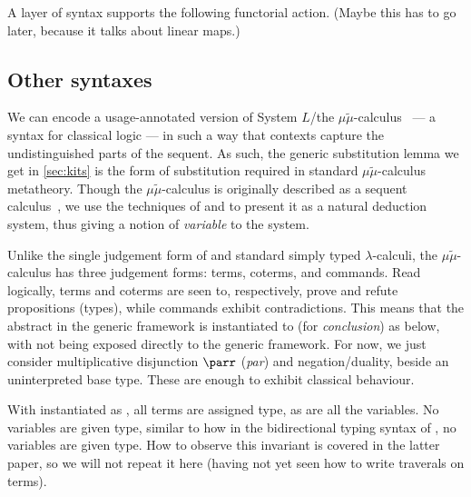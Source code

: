 
A layer of syntax supports the following functorial action.
{\color{red}(Maybe this has to go later, because it talks about linear maps.)}


\subsection{Other syntaxes}

We can encode a usage-annotated version of System $L$/the
$\mu\tilde\mu$-calculus~\cite{CH00} --- a syntax for classical logic --- in
such a way that contexts capture the undistinguished parts of the sequent.
As such, the generic substitution lemma we get in \cref{sec:kits} is the form
of substitution required in standard $\mu\tilde\mu$-calculus metatheory.
Though the $\mu\tilde\mu$-calculus is originally described as a sequent
calculus~\cite{CH00}, we use the techniques of
\citet[p.~12]{herbelin-hab} and \citet{LC06} to present it as a natural
deduction system, thus giving a notion of \emph{variable} to the system.

Unlike the single judgement form of \name{} and standard simply typed
$\lambda$-calculi, the $\mu\tilde\mu$-calculus has three judgement forms:
terms, coterms, and commands.
Read logically, terms and coterms are seen to, respectively, prove and refute
propositions (types), while commands exhibit contradictions.
This means that the abstract  in the generic framework is
instantiated to  (for \emph{conclusion}) as below, with
 not being exposed directly to the generic framework.
For now, we just consider multiplicative disjunction $\parr$ (\emph{par}) and
negation/duality, beside an uninterpreted base type.
These are enough to exhibit classical behaviour.

\begin{minipage}[t]{0.5\textwidth}
  \centering
\end{minipage}
\begin{minipage}[t]{0.5\textwidth}
  \centering
\end{minipage}

With  instantiated as , all terms are assigned
 type, as are all the variables.
No variables are given  type, similar to how in
the bidirectional typing syntax of \citet[p.~25]{AACMM20}, no variables are
given  type.
How to observe this invariant is covered in the latter paper, so we will not
repeat it here (having not yet seen how to write traverals on terms).

